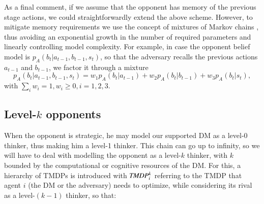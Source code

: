 As a final comment, if we assume that the opponent has memory of the previous stage actions, we could straightforwardly extend the above scheme. However,
to mitigate memory requirements we use the concept of
mixtures of Markov chains \cite{raftery1985model},
thus avoiding an exponential growth in 
the number of required parameters and linearly controlling 
model complexity.
For example,
in case the opponent belief model
is $p_{A}(b_t | a_{t-1}, b_{t-1}, s_t)$, so that the adversary recalls 
 the previous actions $a_{t-1}$ and $b_{t-1}$, we 
 factor it through a mixture 
\[
p_{A}(b_t | a_{t-1}, b_{t-1}, s_t) = w_1 p_{A}(b_t | a_{t-1})  + w_2 p_{A}(b_t | b_{t-1})
 + w_3 p_{A}(b_t | s_t),
 \] 
 with $\sum_i w_i = 1, w_i \geq 0, i=1,2,3$.
 
\subsection{Level-$k$ opponents}\label{sec:k}
When the opponent is
 strategic, he may model our supported DM as a level-0 thinker, thus making
 him a level-1 thinker. This chain can go up to infinity, so we will
 have to deal with modelling the opponent as a level-$k$ thinker, with $k$
 bounded by the computational or cognitive resources of the DM.
For this, a hierarchy of TMDPs is introduced with  
 $\emph{TMDP}_{i}^k$ referring
 to the TMDP that agent $i$ (the DM or the 
 adversary) needs to optimize,
 while considering its rival as a level-$(k-1)$ thinker,
 so that: 

